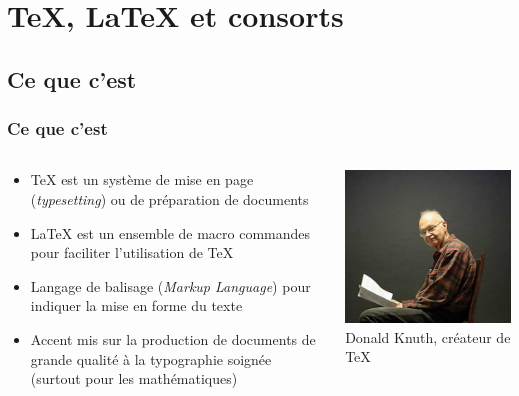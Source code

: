 \documentclass[aspectratio=54,10pt,xcolor=x11names]{beamer}
\theoremstyle{example}
\begin{document}
\section{{\TeX}, {\LaTeX} et consorts}

\subsection{Ce que c'est}

\begin{frame}
  \frametitle{Ce que c'est}
  \begin{columns}
    \begin{column}{.5\textwidth}
      \begin{itemize}
      \item {\TeX} est un système de mise en page (\emph{typesetting})
        ou de préparation de documents
      \item {\LaTeX} est un ensemble de macro commandes pour faciliter
        l'utilisation de {\TeX}
      \item Langage de balisage (\emph{Markup Language}) pour indiquer
        la mise en forme du texte
      \item Accent mis sur la production de documents de grande
        qualité à la typographie soignée (surtout pour les
        mathématiques)
      \end{itemize}
    \end{column}
    \begin{column}{.5\textwidth}
      \centering
      \includegraphics[width=\linewidth]{Knuth} \\
      \footnotesize Donald Knuth, créateur de \TeX
    \end{column}
  \end{columns}
\end{frame}
\end{document}
